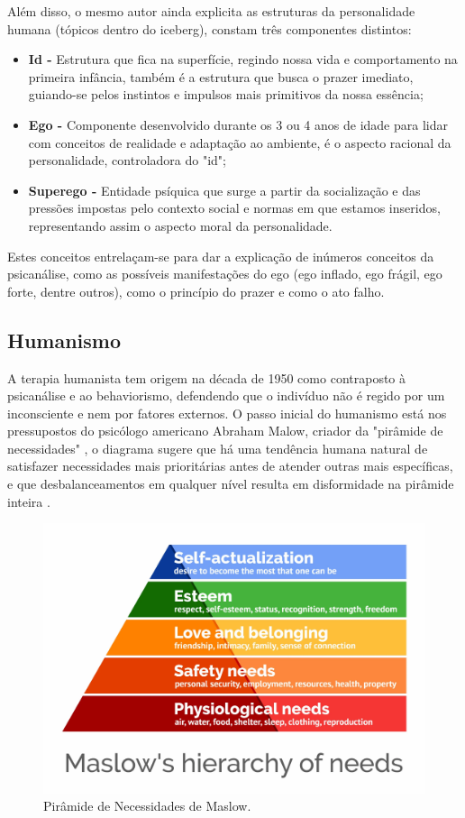 Além disso, o mesmo autor ainda explicita as estruturas da personalidade humana (tópicos dentro do iceberg), constam três componentes distintos:
\begin{itemize}
    \item \textbf{Id -} Estrutura que fica na superfície, regindo nossa vida e comportamento na primeira infância, também é a estrutura que busca o prazer imediato, guiando-se pelos instintos e impulsos mais primitivos da nossa essência;
    \item \textbf{Ego -} Componente desenvolvido durante os 3 ou 4 anos de idade para lidar com conceitos de realidade e adaptação ao ambiente, é o aspecto racional da personalidade, controladora do "id";
    \item \textbf{Superego - } Entidade psíquica que surge a partir da socialização e das pressões impostas pelo contexto social e normas em que estamos inseridos, representando assim o aspecto moral da personalidade. 
\end{itemize}

Estes conceitos entrelaçam-se para dar a explicação de inúmeros conceitos da psicanálise, como as possíveis manifestações do ego (ego inflado, ego frágil, ego forte, dentre outros), como o princípio do prazer e como o ato falho.

\subsection{Humanismo}
\label{sec:Humanismo}
A terapia humanista tem origem na década de 1950 como contraposto à psicanálise e ao behaviorismo, defendendo que o indivíduo não é regido por um inconsciente e nem por fatores externos. O passo inicial do humanismo está nos pressupostos do psicólogo americano Abraham Malow, criador da "pirâmide de necessidades" \cite{Pimenta2019}, o diagrama sugere que há uma tendência humana natural de satisfazer necessidades mais prioritárias antes de atender outras mais específicas, e que desbalanceamentos em qualquer nível resulta em disformidade na pirâmide inteira \cite{Mcleod2023}.

\begin{figure}[H]
    \centering
    \caption{Pirâmide de Necessidades de Maslow.}
    \label{fig:piramideDeNecessidades}
    \includegraphics[width=.8\textwidth]{data/figures/piramide-de-necessidades.png}
\end{figure} 

